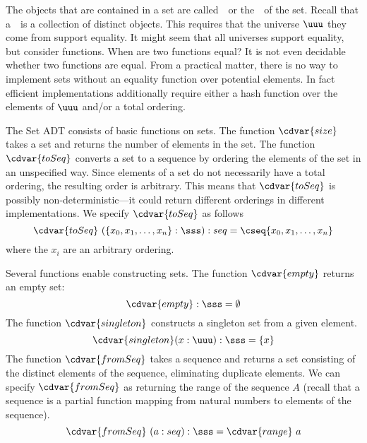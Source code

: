 \begin{gram}
  The objects that are contained in a set are called~~or the~~of the set.  Recall that a~~is a collection of distinct objects.  This requires that
  the universe $\uuu$ they come from support equality.  It might seem that
  all universes support equality, but consider functions.  When are
  two functions equal?   It is not even decidable whether two
  functions are equal.   From a practical matter, there is no way to
  implement sets without an equality function over potential
  elements.   In fact efficient implementations additionally require
  either a hash function over the elements of $\uuu$ and/or a total ordering.
\end{gram}

\begin{gram}
The Set ADT consists of basic functions on sets.  
%
The function $\cdvar{size}$ takes a set and returns the number of elements
in the set.
% 
The function $\cdvar{toSeq}$ converts a set to a sequence by ordering the
elements of the set in an unspecified way. 
%
Since elements of a set do not necessarily have a total ordering, the
resulting order is arbitrary.
%
This means that $\cdvar{toSeq}$ is possibly non-deterministic---it could
return different orderings in different implementations.
%
We specify $\cdvar{toSeq}$ as follows
\[
\cdvar{toSeq}~(\{x_0,x_1,\ldots,x_n\} : \sss): seq = \cseq{x_0,x_1,\ldots,x_n}
\]
where the $x_i$ are an arbitrary ordering. 
\end{gram}


\begin{gram}
Several functions enable constructing sets.
%
The function $\cdvar{empty}$ returns an empty set:
%
\[
\cdvar{empty} : \sss = \emptyset
\]
%
The function $\cdvar{singleton}$ constructs a singleton set from a given
element.
%
\[
\cdvar{singleton} (x : \uuu) : \sss = \{x \}
\]
%
The function $\cdvar{fromSeq}$ takes a sequence and returns a set consisting of the
distinct elements of the sequence, eliminating duplicate elements.
%
We can specify $\cdvar{fromSeq}$ as returning the range of the sequence
$A$ (recall that a sequence is a partial function mapping from natural numbers
to elements of the sequence).
%
\[
\cdvar{fromSeq}~(a : seq) : \sss = \cdvar{range}~a
\]
%
\end{gram}

